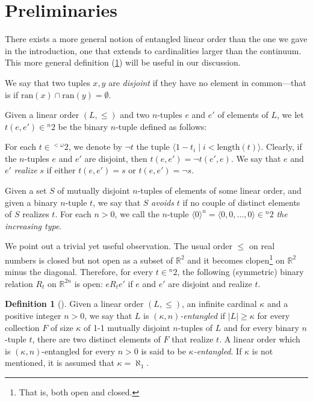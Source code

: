 \documentclass[12pt]{amsart}
\theoremstyle{definition}
\newtheorem{definition}[theorem]{Definition}
\theoremstyle{remark}
\begin{document}
\section{Preliminaries}\label{sec:prel} 

There exists a more general notion of entangled linear order than the one we gave in the introduction, one that extends to 
cardinalities larger than the continuum. This more general definition (\cref{def:entangled}) will be useful in our discussion.

We say that two tuples $x,y$ are \emph{disjoint} if they have no element in common---that is if $\mathrm{ran}(x) \cap \mathrm{ran}(y) = \emptyset$. 

Given a linear order $(L, \le)$ and two $n$-tuples $e$ and $e'$ of elements of $L$, we let $t(e,e') \in {}^n 2$ be the binary $n$-tuple defined as follows: 

For each $t \in {}^{<\omega} 2$, we denote by $\neg t$ the tuple $\langle 1-t_i \mid i < \text{length}(t)\rangle$. Clearly, if the $n$-tuples $e$ and $e'$ are disjoint, then $t(e,e') = \neg t(e', e)$.  We say that $e$ and $e'$ \emph{realize} $s$ if either $t(e,e') = s$ or $t(e,e') = \neg s$.

Given a set $S$ of mutually disjoint $n$-tuples of elements of some linear order, and given a binary $n$-tuple $t$, we say that $S$ \emph{avoids} $t$ if no couple of distinct elements of $S$ realizes $t$. 
For each $n > 0$, we call the $n$-tuple $\langle 0\rangle^n =  \langle 0, 0, \dots, 0\rangle \in {}^n 2$ \emph{the increasing type}.

We point out a trivial yet useful observation.
The usual order $\leq$ on real numbers is closed but not open as a subset of $\mathbb{R}^2$ and it becomes clopen\footnote{That is, both open and closed.} on $\mathbb{R}^2$ minus the diagonal.
Therefore, for every $t \in {}^n 2$, the following (symmetric) binary relation $R_t$ on $\mathbb{R}^{2n}$ is open: $e \mathrel{R_t} e'$ if $e$ and $e'$ are disjoint and realize $t$.

\begin{definition}[\cite{avraham1981martin, MR799818}]\label{def:entangled} Given a linear order $(L, \le)$, an infinite cardinal $\kappa$ and a positive integer $n > 0$, we say that $L$ is \emph{$(\kappa, n)$-entangled} if $|L| \ge \kappa$  for every collection $F$ of size $\kappa$ of 1-1 mutually disjoint $n$-tuples of $L$ and for every binary $n$-tuple $t$, there are two distinct elements of $F$ that realize $t$. A linear order which is $(\kappa, n)$-entangled for every $n > 0$ is said to be \emph{$\kappa$-entangled}. If $\kappa$ is not mentioned, it is assumed that $\kappa = \aleph_1$. 
\end{definition}
\end{document}
